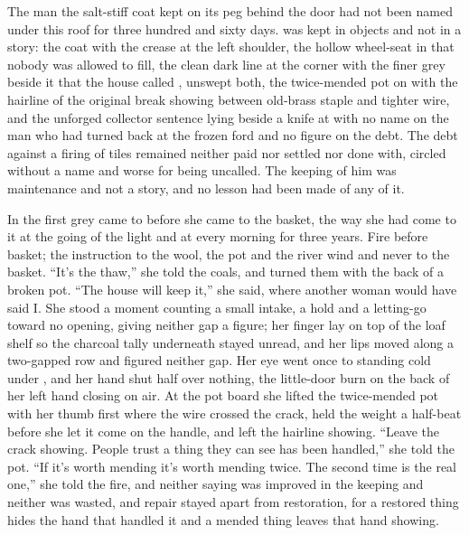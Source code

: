The man the salt-stiff coat kept on its peg behind the door had not been named under this roof for three hundred and sixty days.  was kept in objects and not in a story: the coat with the crease at the left shoulder, the hollow wheel-seat in  that nobody was allowed to fill, the clean dark line at the corner with the finer grey beside it that the house called , unswept both, the twice-mended pot on  with the hairline of the original break showing between old-brass staple and tighter wire, and the unforged collector sentence lying beside a knife at  with no name on the man who had turned back at the frozen ford and no figure on the debt. The debt against a firing of tiles remained neither paid nor settled nor done with, circled without a name and worse for being uncalled. The keeping of him was maintenance and not a story, and no lesson had been made of any of it.

\scenebreak

In the first grey  came to  before she came to the basket, the way she had come to it at the going of the light and at every morning for three years. Fire before basket; the instruction to the wool, the pot and the river wind and never to the basket. “It's the thaw,” she told the coals, and turned them with the back of a broken pot. “The house will keep it,” she said, where another woman would have said I. She stood a moment counting a small intake, a hold and a letting-go toward no opening, giving neither gap a figure; her finger lay on top of the loaf shelf so the charcoal tally underneath stayed unread, and her lips moved along a two-gapped row and figured neither gap. Her eye went once to  standing cold under , and her hand shut half over nothing, the little-door burn on the back of her left hand closing on air. At the pot board she lifted the twice-mended pot with her thumb first where the wire crossed the crack, held the weight a half-beat before she let it come on the handle, and left the hairline showing. “Leave the crack showing. People trust a thing they can see has been handled,” she told the pot. “If it's worth mending it's worth mending twice. The second time is the real one,” she told the fire, and neither saying was improved in the keeping and neither was wasted, and repair stayed apart from restoration, for a restored thing hides the hand that handled it and a mended thing leaves that hand showing.

